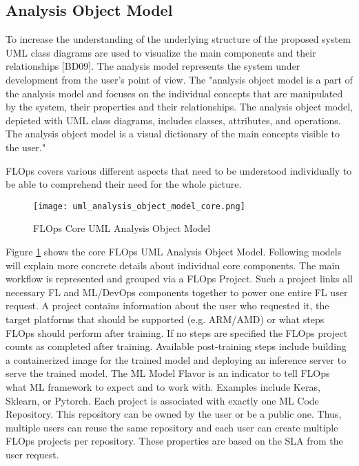 \subsection{Analysis Object Model}
To increase the understanding of the underlying structure of the proposed
system UML class diagrams are used to visualize the main components and
their relationships [BD09].
The analysis model represents the system under development from the user’s point of view. The
"analysis object model is a part of the analysis model and focuses on the individual concepts that
are manipulated by the system, their properties and their relationships. The analysis object
model, depicted with UML class diagrams, includes classes, attributes, and operations. The
analysis object model is a visual dictionary of the main concepts visible to the user."

FLOps covers various different aspects that need to be understood individually to be able to comprehend their need for the whole picture.



\begin{figure}[h]
    \centering
    \texttt{[image: uml\_analysis\_object\_model\_core.png]}
    \caption{FLOps Core UML Analysis Object Model}
    \label{fig:uml_core_analysis_object_model}
\end{figure}

Figure \ref{fig:uml_core_analysis_object_model} shows the core FLOps UML Analysis Object Model.
Following models will explain more concrete details about individual core components. 
The main workflow is represented and grouped via a FLOps Project.
Such a project links all necessary FL and ML/DevOps components together to power one entire FL user request.
A project contains information about the user who requested it, the target platforms that should be supported (e.g. ARM/AMD) or what steps FLOps should perform after training.
If no steps are specified the FLOps project counts as completed after training.
Available post-training steps include building a containerized image for the trained model 
and deploying an inference server to serve the trained model.
The ML Model Flavor is an indicator to tell FLOps what ML framework to expect and to work with.
Examples include Keras, Sklearn, or Pytorch.
Each project is associated with exactly one ML Code Repository.
This repository can be owned by the user or be a public one.
Thus, multiple users can reuse the same repository and each user can create multiple FLOps projects per repository.
These properties are based on the SLA from the user request. 

